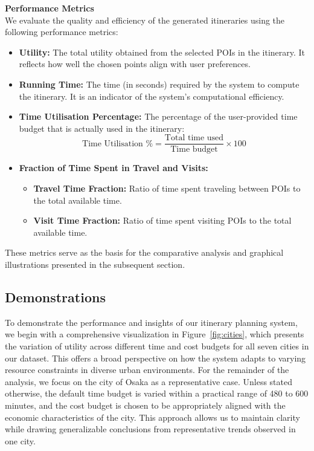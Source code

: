 \vspace{0.5cm}
\noindent\textbf{Performance Metrics}\\
We evaluate the quality and efficiency of the generated itineraries using the following performance metrics:

\begin{itemize}
    \item \textbf{Utility:} The total utility obtained from the selected POIs in the itinerary. It reflects how well the chosen points align with user preferences.
    
    \item \textbf{Running Time:} The time (in seconds) required by the system to compute the itinerary. It is an indicator of the system's computational efficiency.
    
    \item \textbf{Time Utilisation Percentage:} The percentage of the user-provided time budget that is actually used in the itinerary:
    \[
    \text{Time Utilisation \%} = \frac{\text{Total time used}}{\text{Time budget}} \times 100
    \]
    
    \item \textbf{Fraction of Time Spent in Travel and Visits:}
    \begin{itemize}
        \item \textbf{Travel Time Fraction:} Ratio of time spent traveling between POIs to the total available time.
        \item \textbf{Visit Time Fraction:} Ratio of time spent visiting POIs to the total available time.
    \end{itemize}
\end{itemize}

These metrics serve as the basis for the comparative analysis and graphical illustrations presented in the subsequent section.

\subsection{Demonstrations}

To demonstrate the performance and insights of our itinerary planning system, we begin with a comprehensive visualization in Figure~\ref{fig:cities}, which presents the variation of utility across different time and cost budgets for all seven cities in our dataset. This offers a broad perspective on how the system adapts to varying resource constraints in diverse urban environments. For the remainder of the analysis, we focus on the city of Osaka as a representative case. Unless stated otherwise, the default time budget is varied within a practical range of 480 to 600 minutes, and the cost budget is chosen to be appropriately aligned with the economic characteristics of the city. This approach allows us to maintain clarity while drawing generalizable conclusions from representative trends observed in one city.

